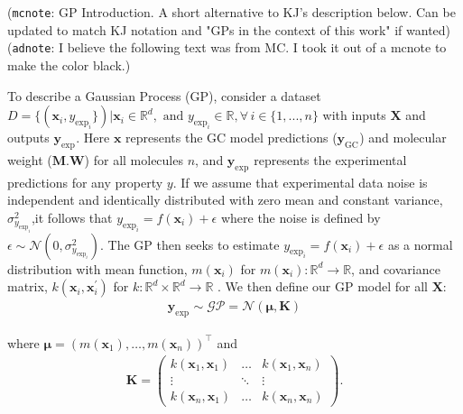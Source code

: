 \documentclass[journal=jacsat,manuscript=article]{achemso}
\newcommand{\xvec}{\ensuremath{\mathbf{x}}}
\newcommand{\adnote}[1]{{\color{OliveGreen} (\texttt{adnote}: #1)}}
\newcommand{\mcnote}[1]{{\color{Plum} (\texttt{mcnote}: #1)}}
\newcommand{\Ygcvec}[1][]{\ensuremath{\mathbf{y}_{\text{GC}_{#1}}}}
\newcommand{\yexpvec}[1][]{\ensuremath{\mathbf{y}_{\text{exp}_{#1}}}}
\newcommand{\yexp}[1][]{\ensuremath{y_{\text{exp}_{#1}}}}
\begin{document}
\mcnote{GP Introduction. A short alternative to KJ's description below. Can be updated to match KJ notation and "GPs in the context of this work" if wanted}
\adnote{I believe the following text was from MC. I took it out of a mcnote to make the color black.}


To describe a Gaussian Process (GP), consider a dataset $D = \{(\xvec_i, \yexp[i]\}) \vert \xvec_i \in \mathbb{R}^d, \text{ and } \yexp[i] \in \mathbb{R}, \forall \, i \in \{1,. . ., n\}$ with inputs $\mathbf{X}$ and outputs $\yexpvec[]$. Here $\xvec$ represents the GC model predictions ($\Ygcvec$) and molecular weight ($\textbf{M.W}$) for all molecules $n$, and $\yexpvec$ represents the experimental predictions for any property $y$. If we assume that experimental data noise is independent and identically distributed with zero mean and constant variance, $\sigma_{\yexp[i]}^2$,it follows that $\yexp[i] = f(\xvec_i) + \epsilon$ where the noise is defined by $\epsilon \sim \mathcal{N}(0,\sigma_{\yexp[i]}^2)$. The GP then seeks to estimate $\yexp[i] = f(\xvec_i) + \epsilon$ as a normal distribution with mean function, $m(\xvec_i)$ for $m(\xvec_i): \mathbb{R}^d \rightarrow \mathbb{R}$, and covariance matrix, $k(\xvec_i, \xvec_i^{\prime})$ for $k: \mathbb{R}^d \times \mathbb{R}^d \rightarrow \mathbb{R}$ \cite{Frazier2018AOptimization}. We then define our GP model for all $\mathbf{X}$:
\begin{gather*}
     \yexpvec \sim \mathcal{GP} = \mathcal{N}(\boldsymbol{\mu}, \mathbf{K})
\end{gather*}

\noindent where $\boldsymbol{\mu} = (m(\xvec_1), \dots, m(\xvec_n))^\intercal$ and
\begin{gather}
    \mathbf{K}= 
    \left(
    \begin{matrix}
        k(\xvec_1,\xvec_1) & \dots & k(\xvec_1,\xvec_n) \\
        \vdots & \ddots & \vdots \\
        k(\xvec_n,\xvec_1) & \dots & k(\xvec_n,\xvec_n)
    \end{matrix}\right).
\end{gather}
\end{document}
